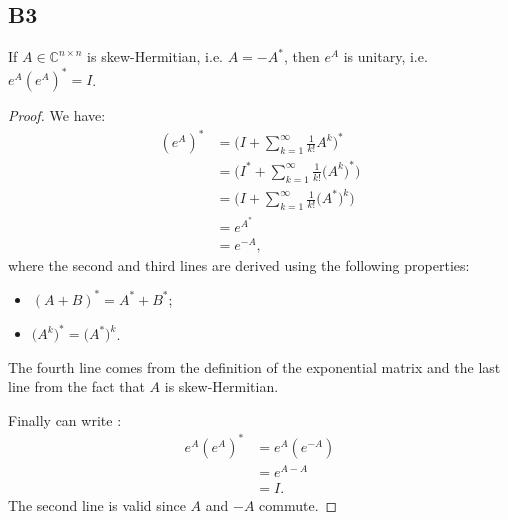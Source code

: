 \documentclass[11pt]{article}
\newcommand{\complex}{\mathbb{C}} %
\begin{document}
\subsection*{B3}
If \(A \in \complex^{n \times n}\) is skew-Hermitian, i.e. $A=-A^*$, then $e^A$ is unitary, i.e. $e^A(e^A)^*=I$.
\begin{proof}
We have:
\begin{align*}
    (e^A)^*&=\Bigg(I+\sum^{\infty}_{k=1}\frac{1}{k!}A^k\Bigg)^{*}\\
    &=\Bigg(I^{*}+\sum^{\infty}_{k=1}\frac{1}{k!}\big(A^k\big)^{*}\Bigg)\\
    &=\Bigg(I+\sum^{\infty}_{k=1}\frac{1}{k!}\big(A^{*}\big)^k\Bigg)\\
    &=e^{A^{*}}\\
    &=e^{-A},
\end{align*}
where the second and third lines are derived using the following properties:
\begin{itemize}
    \item $(A+B)^{*}=A^{*}+B^{*}$;
    \item $\big(A^k\big)^*=\big(A^*\big)^k$.
\end{itemize}
The fourth line comes from the definition of the exponential matrix and the last line from the fact that \(A\) is skew-Hermitian.

Finally can write :
\begin{align*}
    e^A(e^A)^*&=e^A(e^{-A})\\
    &=e^{A-A}\\
    &=I.
\end{align*}
The second line is valid since \(A\) and \(-A\) commute.
\end{proof}
\end{document}
